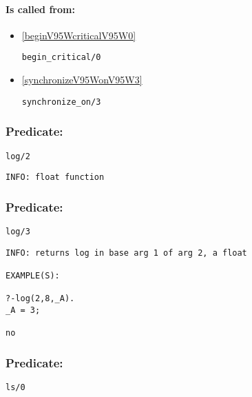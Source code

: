 \paragraph{Is called from:} 
\begin{itemize}
\item \ref{beginV95WcriticalV95W0} 
\begin{verbatim}
begin_critical/0
\end{verbatim}

\item \ref{synchronizeV95WonV95W3} 
\begin{verbatim}
synchronize_on/3
\end{verbatim}

\end{itemize}

\subsubsection{Predicate:} \label{logV95W2}

\begin{verbatim}
log/2
\end{verbatim}

{\small \begin{verbatim}
INFO: float function

\end{verbatim}}

\subsubsection{Predicate:} \label{logV95W3}

\begin{verbatim}
log/3
\end{verbatim}

{\small \begin{verbatim}
INFO: returns log in base arg 1 of arg 2, a float

EXAMPLE(S):

?-log(2,8,_A).
_A = 3;

no

\end{verbatim}}

\subsubsection{Predicate:} \label{lsV95W0}

\begin{verbatim}
ls/0
\end{verbatim}

